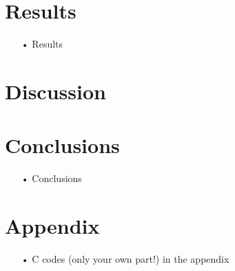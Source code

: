\documentclass[a4paper,11pt]{article}
\begin{document}
\section{Results}
\begin{enumerate}
\item[•] Results
\end{enumerate}

\section{Discussion}

\section{Conclusions}
\begin{enumerate}
\item[•] Conclusions
\end{enumerate}




\section{Appendix}
\begin{enumerate}
\item[•] C codes (only your own part!) in the appendix 
\end{enumerate}
\end{document}
